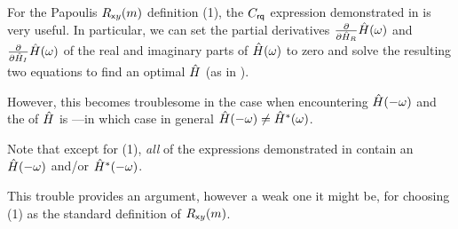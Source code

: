 For the Papoulis $R_{{\mathsf xy}}(m)$ definition (1), the $C_{\mathsf{rq}}$ expression demonstrated in  is very
useful.
In particular, we can
set the partial derivatives
${\frac{{\partial}}{{\partial\hat{H}_R}} }\hat{H}(\omega)$ and ${\frac{{\partial}}{{\partial\hat{H}_I}} }\hat{H}(\omega)$
of the real and imaginary parts
of $\hat{H}(\omega)$ to zero and solve the resulting two equations to find an optimal $\hat{H}$ (as in ).

However, this becomes troublesome in the case when encountering $\hat{H}(-\omega)$ and the
 of $\hat{H}$ is ---in which case in general $\hat{H}(-\omega)\neq\hat{H}^\ast(\omega)$.

Note that except for (1), \emph{all} of the expressions demonstrated in  contain an $\hat{H}(-\omega)$
and/or $\hat{H}^\ast(-\omega)$.

This trouble provides an argument, however a weak one it might be, for choosing (1) as the standard definition of $R_{{\mathsf xy}}(m)$.

